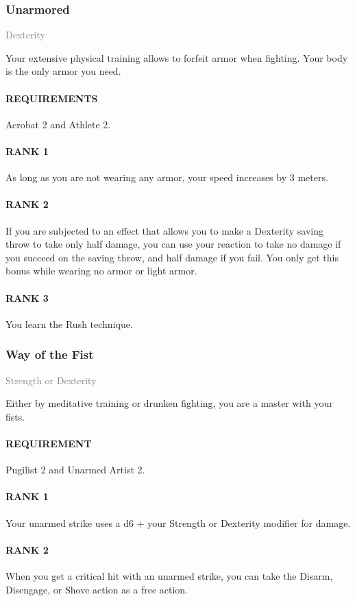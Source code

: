 \subsubsection{Unarmored} \label{feat::unarmored}
\small{\textcolor{gray}{Dexterity}}

\normalsize
Your extensive physical training allows to forfeit armor when fighting.
Your body is the only armor you need.
\paragraph{REQUIREMENTS} Acrobat 2 and Athlete 2.
\paragraph{RANK 1} As long as you are not wearing any armor, your speed increases by 3 meters.
\paragraph{RANK 2} If you are subjected to an effect that allows you to make a Dexterity saving throw to take only half damage, you can use your reaction to take no damage if you succeed on the saving throw, and half damage if you fail.
You only get this bonus while wearing no armor or light armor.
\paragraph{RANK 3} You learn the Rush technique.

\subsubsection{Way of the Fist} \label{feat::wayofthefist}
\small{\textcolor{gray}{Strength or Dexterity}}

\normalsize
Either by meditative training or drunken fighting, you are a master with your fists.
\paragraph{REQUIREMENT} Pugilist 2 and Unarmed Artist 2.
\paragraph{RANK 1} Your unarmed strike uses a d6 + your Strength or Dexterity modifier for damage.
\paragraph{RANK 2} When you get a critical hit with an unarmed strike, you can take the Disarm, Disengage, or Shove action as a free action.
